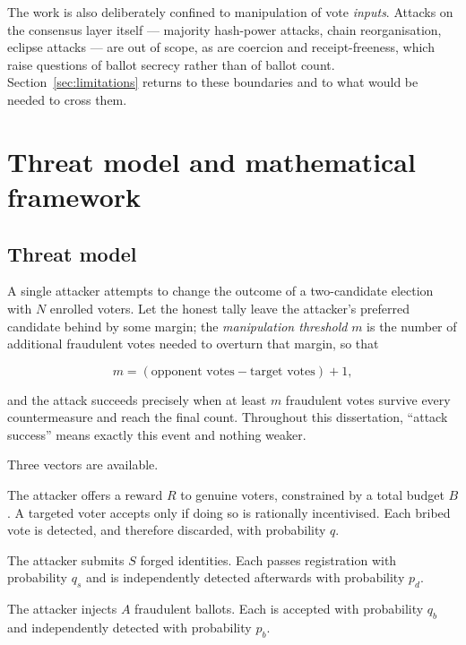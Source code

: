 \documentclass[11pt,a4paper]{article}
\begin{document}
The work is also deliberately confined to manipulation of vote \emph{inputs}. Attacks on
the consensus layer itself --- majority hash-power attacks, chain reorganisation, eclipse
attacks --- are out of scope, as are coercion and receipt-freeness, which raise questions
of ballot secrecy rather than of ballot count. Section~\ref{sec:limitations} returns to
these boundaries and to what would be needed to cross them.



\section{Threat model and mathematical framework}
\label{sec:model}

\subsection{Threat model}

A single attacker attempts to change the outcome of a two-candidate election with $N$
enrolled voters. Let the honest tally leave the attacker's preferred candidate behind by
some margin; the \emph{manipulation threshold} $m$ is the number of additional
fraudulent votes needed to overturn that margin, so that

\begin{equation}
m = (\text{opponent votes} - \text{target votes}) + 1 ,
\label{eq:threshold}
\end{equation}

and the attack succeeds precisely when at least $m$ fraudulent votes survive every
countermeasure and reach the final count. Throughout this dissertation, ``attack
success'' means exactly this event and nothing weaker.

Three vectors are available.

\begin{description}[leftmargin=1.4em,style=nextline,itemsep=2pt]
  \item[Bribery.] The attacker offers a reward $R$ to genuine voters, constrained by a
    total budget $B$. A targeted voter accepts only if doing so is rationally
    incentivised. Each bribed vote is detected, and therefore discarded, with
    probability $q$.
  \item[Sybil registration.] The attacker submits $S$ forged identities. Each passes
    registration with probability $q_s$ and is independently detected afterwards with
    probability $p_d$.
  \item[Ballot stuffing.] The attacker injects $A$ fraudulent ballots. Each is accepted
    with probability $q_b$ and independently detected with probability $p_b$.
\end{description}
\end{document}
